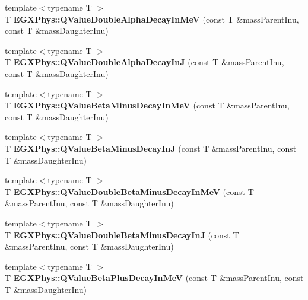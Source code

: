 \begin{DoxyCompactItemize}
{\footnotesize template$<$typename T $>$ }\\T {\bfseries E\+G\+X\+Phys\+::\+Q\+Value\+Double\+Alpha\+Decay\+In\+MeV} (const T \&mass\+Parent\+Inu, const T \&mass\+Daughter\+Inu)
\item 
\mbox{\label{group___e_g_x_phys-_q_value_gaefd0ecd4ae3166d18a4748ff540e6bfc}} 
{\footnotesize template$<$typename T $>$ }\\T {\bfseries E\+G\+X\+Phys\+::\+Q\+Value\+Double\+Alpha\+Decay\+InJ} (const T \&mass\+Parent\+Inu, const T \&mass\+Daughter\+Inu)
\item 
\mbox{\label{group___e_g_x_phys-_q_value_ga42468e998cf58a027a676755aa1339ba}} 
{\footnotesize template$<$typename T $>$ }\\T {\bfseries E\+G\+X\+Phys\+::\+Q\+Value\+Beta\+Minus\+Decay\+In\+MeV} (const T \&mass\+Parent\+Inu, const T \&mass\+Daughter\+Inu)
\item 
\mbox{\label{group___e_g_x_phys-_q_value_ga4a2ab24ffb317abc97ce46c92bb64c3c}} 
{\footnotesize template$<$typename T $>$ }\\T {\bfseries E\+G\+X\+Phys\+::\+Q\+Value\+Beta\+Minus\+Decay\+InJ} (const T \&mass\+Parent\+Inu, const T \&mass\+Daughter\+Inu)
\item 
\mbox{\label{group___e_g_x_phys-_q_value_ga0eefdd84aa89d210e00dca043368dfeb}} 
{\footnotesize template$<$typename T $>$ }\\T {\bfseries E\+G\+X\+Phys\+::\+Q\+Value\+Double\+Beta\+Minus\+Decay\+In\+MeV} (const T \&mass\+Parent\+Inu, const T \&mass\+Daughter\+Inu)
\item 
\mbox{\label{group___e_g_x_phys-_q_value_gaf19d189152aec04d8b1ebbbe8792540b}} 
{\footnotesize template$<$typename T $>$ }\\T {\bfseries E\+G\+X\+Phys\+::\+Q\+Value\+Double\+Beta\+Minus\+Decay\+InJ} (const T \&mass\+Parent\+Inu, const T \&mass\+Daughter\+Inu)
\item 
\mbox{\label{group___e_g_x_phys-_q_value_ga9bf549cd4f8e1c76e9cc41b72d4f0279}} 
{\footnotesize template$<$typename T $>$ }\\T {\bfseries E\+G\+X\+Phys\+::\+Q\+Value\+Beta\+Plus\+Decay\+In\+MeV} (const T \&mass\+Parent\+Inu, const T \&mass\+Daughter\+Inu)

\end{DoxyCompactItemize}
